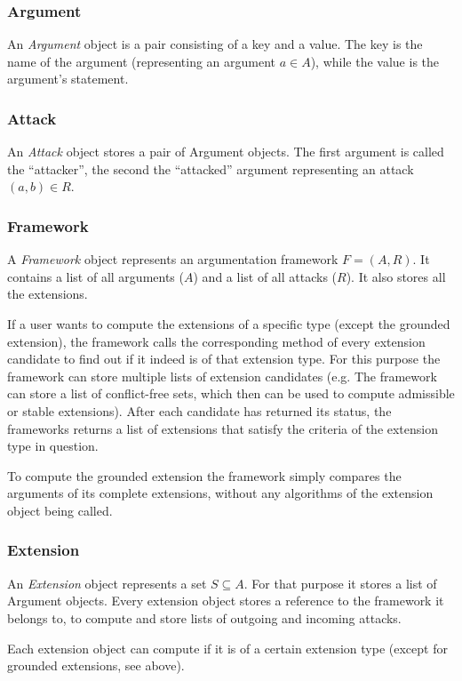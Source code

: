 \documentclass[draft,final]{vutinfth} %
\newcommand{\hl}{\par\vspace{6pt}} %
\begin{document}
\subsubsection{Argument}
An \emph{Argument} object is a pair consisting of a key and a value. The key is the name of the argument (representing an argument $a\in A$), while the value is the argument's statement.

\subsubsection{Attack}
An \emph{Attack} object stores a pair of Argument objects. The first argument is called the ``attacker'', the second the ``attacked'' argument representing an attack $(a,b)\in R$.

\subsubsection{Framework}
A \emph{Framework} object represents an argumentation framework $F=(A,R)$. It contains a list of all arguments ($A$) and a list of all attacks ($R$). It also stores all the extensions.\hl
If a user wants to compute the extensions of a specific type (except the grounded extension), the framework calls the corresponding method of every extension candidate to find out if it indeed is of that extension type. For this purpose the framework can store multiple lists of extension candidates (e.g. The framework can store a list of conflict-free sets, which then can be used to compute admissible or stable extensions). After each candidate has returned its status, the frameworks returns a list of extensions that satisfy the criteria of the extension type in question.\hl
To compute the grounded extension the framework simply compares the arguments of its complete extensions, without any algorithms of the extension object being called.

\subsubsection{Extension}
An \emph{Extension} object represents a set $S\subseteq A$. For that purpose it stores a list of Argument objects. Every extension object stores a reference to the framework it belongs to, to compute and store lists of outgoing and incoming attacks.\hl
Each extension object can compute if it is of a certain extension type (except for grounded extensions, see above). %


\backmatter

\listoffigures

%
%
\printbibliography

\end{document}
